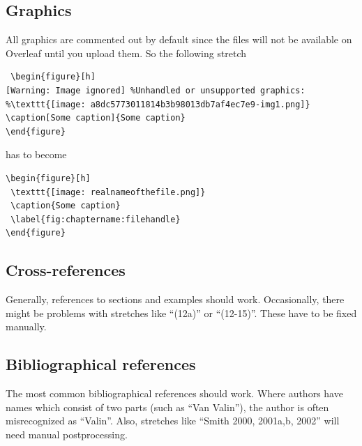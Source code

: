 \subsection{Graphics}
All graphics are commented out by default since the files will not be available on Overleaf until you upload them. So the following stretch

\begin{verbatim}
 \begin{figure}[h]
[Warning: Image ignored] %Unhandled or unsupported graphics:
%\texttt{[image: a8dc5773011814b3b98013db7af4ec7e9-img1.png]}
\caption[Some caption]{Some caption}
\end{figure}
\end{verbatim}

has to become


\begin{verbatim}
\begin{figure}[h]
 \texttt{[image: realnameofthefile.png]}
 \caption{Some caption}
 \label{fig:chaptername:filehandle}
\end{figure}
\end{verbatim}

\subsection{Cross-references}
Generally, references to sections and examples should work. Occasionally, there might be problems with stretches like ``(12a)'' or ``(12-15)''. These have to be fixed manually.

\subsection{Bibliographical references}
The most common bibliographical references should work. Where authors have names which consist of two parts (such as ``Van Valin''), the author is often misrecognized as ``Valin''. Also, stretches like ``Smith 2000, 2001a,b, 2002'' will need manual postprocessing. 





